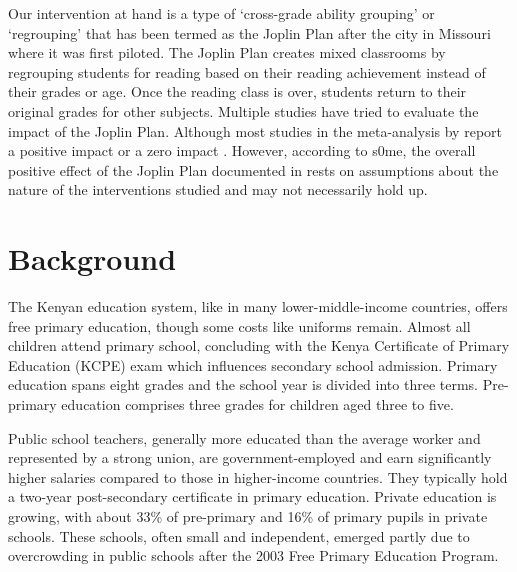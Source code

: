 \documentclass[12pt]{article}
\begin{document}
Our intervention at hand is a type of `cross-grade ability grouping' or `regrouping' \citep{slavin:1987} that has been termed as the Joplin Plan \citep{floyd:1954} after the city in Missouri where it was first piloted. The Joplin Plan creates mixed classrooms by regrouping students for reading based on their reading achievement instead of their grades or age. Once the reading class is over, students return to their original grades for other subjects. Multiple studies have tried to evaluate the impact of the Joplin Plan. Although most studies in the meta-analysis by \cite{slavin:1987} report a positive impact or a zero impact \citep{carson/thompson:1964,powell:1964}. However, according to s0me, the overall positive effect of the Joplin Plan documented in \cite{slavin:1987} rests on assumptions about the nature of the interventions studied and may not necessarily hold up. 



\section{Background}
\label{sec:back}

The Kenyan education system, like in many lower-middle-income countries, offers free primary education, though some costs like uniforms remain. Almost all children attend primary school, concluding with the Kenya Certificate of Primary Education (KCPE) exam which influences secondary school admission. Primary education spans eight grades and the school year is divided into three terms. Pre-primary education comprises three grades for children aged three to five.

Public school teachers, generally more educated than the average worker and represented by a strong union, are government-employed and earn significantly higher salaries compared to those in higher-income countries. They typically hold a two-year post-secondary certificate in primary education. Private education is growing, with about 33\% of pre-primary and 16\% of primary pupils in private schools. These schools, often small and independent, emerged partly due to overcrowding in public schools after the 2003 Free Primary Education Program.
\end{document}
